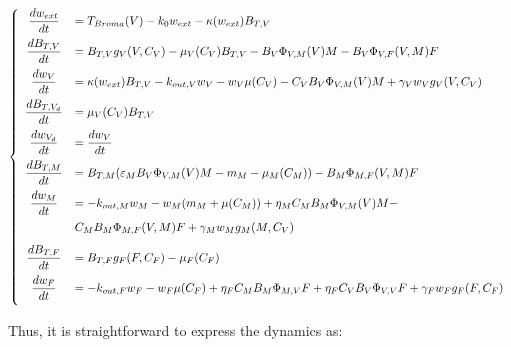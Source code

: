 \documentclass[11pt]{article}
\begin{document}
\begin{equation}
\left\lbrace
\begin{array}{c l}
\dfrac{dw_{ext}}{dt} & = T_{Broma}(V) - k_0w_{ext} - \kappa(w_{ext})B_{T,V} \\[3mm]
\dfrac{dB_{T,V}}{dt} & =
B_{T,V} g_V(V, C_V)	- \mu_V(C_V)B_{T,V} - B_V \Phi_{V,M}(V) M - B_V \Phi_{V,F}(V,M) F\\[3mm]
\dfrac{dw_{V}}{dt} & = \kappa(w_{ext}) B_{T,V} - k_{out, V} w_V - w_V \mu(C_V) - C_V B_V \Phi_{V,M}(V)M + \gamma_V w_V g_V(V, C_V)\\[3mm]
%
\dfrac{dB_{T,V_d}}{dt} & = \mu_V(C_V)B_{T,V}\\[3mm]
\dfrac{dw_{V_d}}{dt} & = \dfrac{dw_{V}}{dt}\\[3mm]
%
\dfrac{dB_{T,M}}{dt} & =
B_{T,M} (\varepsilon_MB_V  \Phi_{V,M}(V)M - m_M - \mu_M(C_M) ) - B_M \Phi_{M,F}(V, M) F\\[3mm]
\dfrac{dw_{M}}{dt} & = - k_{out, M} w_M - w_M (m_M + \mu(C_M)) + \eta_M C_M B_M \Phi_{V,M}(V)M - \\[3mm]
& C_M B_M \Phi_{M,F}(V,M)F + \gamma_M w_M g_M(M, C_V)\\[3mm]
%
\dfrac{dB_{T,F}}{dt} & =
B_{T,F} g_F(F, C_F)	- \mu_F(C_F) \\[3mm]
\dfrac{dw_{F}}{dt} & = - k_{out, F} w_F - w_F \mu(C_F) + \eta_F C_M B_M \Phi_{M,V} F  + \eta_F C_V B_V \Phi_{V,V} F + \gamma_F w_F g_F(F, C_F)\\[3mm]
\end{array}
\right.
\end{equation}


%

Thus, it is straightforward to express the dynamics as:
\end{document}
